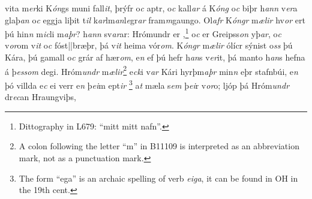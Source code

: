  vita  
  m\textit{er}ki K\textit{ón}gs muni   fall\textit{it}, 
þrýfr   o\textit{c} 
   aptr, o\textit{c} kall\textit{ar} á K\textit{óng} o\textit{c} biþr h\textit{ann} v\textit{er}a glaþ\textit{an} o\textit{c} eggja liþit t\textit{il} k\textit{ar}lm\textit{an}l\textit{e}gr\textit{ar}
fram\textit{m}gaungo.  Ol\textit{afr} K\textit{óngr} m\textit{ælir} hv\textit{or} ert þú  hin\textit{n} m\textit{ic}li m\textit{aþr}? h\textit{ann}
sv\textit{ar}ar: Hrómundr er  ,\footnote{Dittography in L679: \enquote{mitt mitt nafn}.}  o\textit{c} er Greipss\textit{on}  yþ\textit{ar}, o\textit{c} v\textit{or}om
v\textit{it}   
o\textit{c} fóst||bræþr, þá v\textit{it} heima vór\textit{om}. K\textit{óngr}
m\textit{ælir} ólícr sýnist o\textit{ss} þú    Kára,   þú   gamall o\textit{c} grár af  hær\textit{om}, e\textit{n} ef þú
hefr h\textit{an}s   v\textit{er}it, þá manto h\textit{an}s hefna  á
þ\textit{ess}\textit{om} degi. 
Hróm\textit{undr} m\textit{ælir}\footnote{A colon following the letter \enquote{m} in B11109 is interpreted as an abbreviation mark, not as a punctuation mark.}  e\textit{ck}i v\textit{ar} Kári hyrþm\textit{aþr} min\textit{n} eþr  stafnbúi, e\textit{n} þó villda e\textit{c}  ei verr e\textit{n} þ\textit{ei}m   ept\textit{ir}  \footnote{The form \enquote{ega} is an archaic spelling of verb \textit{eiga}, it can be found in OH in the 19th cent.}  a\textit{t} mæla s\textit{em} þ\textit{ei}r   v\textit{or}o; 
ljóp þá Hróm\textit{undr}  dr\textit{ec}an Hraungviþs, 
